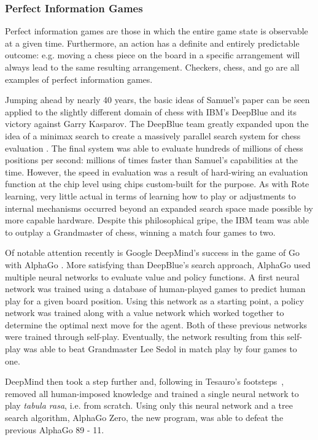 

\subsubsection*{Perfect Information Games}

Perfect information games are those in which the entire game state is observable
at a given time.
%
Furthermore,
an action has a definite and entirely predictable outcome:
e.g. moving a chess piece on the board in a specific arrangement will always
lead to the same resulting arrangement.
%
Checkers, chess, and go are all examples of perfect information games.

Jumping ahead by nearly 40 years,
the basic ideas of Samuel's paper can be seen applied to the slightly different
domain of chess with IBM's DeepBlue
and its victory against Garry Kasparov.
%
The DeepBlue team greatly expanded upon the idea of a minimax search to create a
massively parallel search system for chess evaluation
\cite{ibm_deepblue}.
%
The final system was able to evaluate hundreds of millions of chess positions
per second:
millions of times faster than Samuel's capabilities at the time.
%
However,
the speed in evaluation was a result of hard-wiring an evaluation function at
the chip level using chips custom-built for the purpose.
%
As with Rote learning,
very little actual in terms of learning how to play or adjustments to internal
mechanisms occurred
beyond an expanded search space made possible by more capable hardware.
%
Despite this philosophical gripe,
the IBM team was able to outplay a Grandmaster of chess,
winning a match four games to two.


Of notable attention recently is Google DeepMind's
success in the game of Go with AlphaGo
\cite{deepmind_alphago}.
%
More satisfying than DeepBlue's search approach,
AlphaGo used multiple neural networks to evaluate value and policy functions.
%
A first neural network was trained using a database of human-played games
to predict human play for a given board position.
%
Using this network as a starting point,
a policy network was trained
along with a value network which worked together to determine the optimal next
move for the agent.
%
Both of these previous networks were trained through self-play.
%
Eventually,
the network resulting from this self-play was able to beat Grandmaster Lee Sedol
in match play by four games to one.


DeepMind then took a step further and,
following in Tesauro's footsteps~\cite{tdgammon},
removed all human-imposed knowledge and
trained a single neural network to play \textit{tabula rasa}, i.e. from scratch.
%
Using only this neural network and a tree search algorithm,
AlphaGo Zero, the new program,
was able to defeat the previous AlphaGo 89 - 11.


